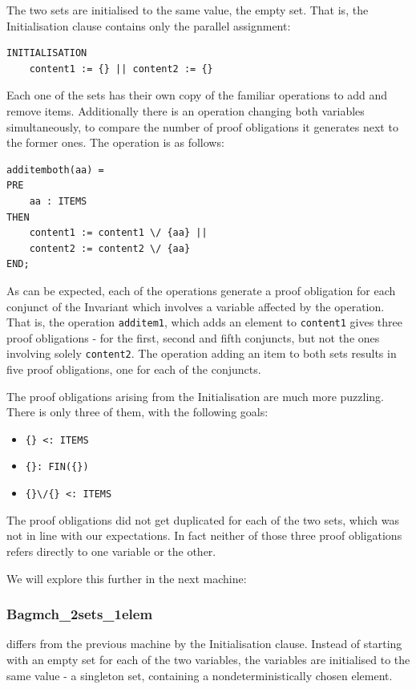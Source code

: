 \documentclass[12pt,journal,duplex]{IEEEtran}
\begin{document}
	The two sets are initialised to the same value, the empty set. That is, the Initialisation clause contains only the parallel assignment:
\begin{lstlisting}
INITIALISATION
	content1 := {} || content2 := {}
\end{lstlisting}

	Each one of the sets has their own copy of the familiar operations to add and remove items. Additionally there is an operation changing both variables simultaneously, to compare the number of proof obligations it generates next to the former ones. The operation is as follows:

\begin{lstlisting}
additemboth(aa) =
PRE
	aa : ITEMS
THEN
	content1 := content1 \/ {aa} ||
	content2 := content2 \/ {aa}
END;
\end{lstlisting}

	As can be expected, each of the operations generate a proof obligation for each conjunct of the Invariant which involves a variable affected by the operation. That is, the operation \texttt{additem1}, which adds an element to \texttt{content1} gives three proof obligations - for the first, second and fifth conjuncts, but not the ones involving solely \texttt{content2}. The operation adding an item to both sets results in five proof obligations, one for each of the conjuncts.

	The proof obligations arising from the Initialisation are much more puzzling. There is only three of them, with the following goals:
\begin{itemize}
	\item \verb|{} <: ITEMS |
	\item \verb|{}: FIN({}) |
	\item \verb|{}\/{} <: ITEMS|
\end{itemize}
	The proof obligations did not get duplicated for each of the two sets, which was not in line with our expectations. In fact neither of those three proof obligations refers directly to one variable or the other.

	We will explore this further in the next machine:

	\subsubsection{Bagmch\_2sets\_1elem} differs from the previous machine by the Initialisation clause. Instead of starting with an empty set for each of the two variables, the variables are initialised to the same value - a singleton set, containing a nondeterministically chosen element.
\end{document}
